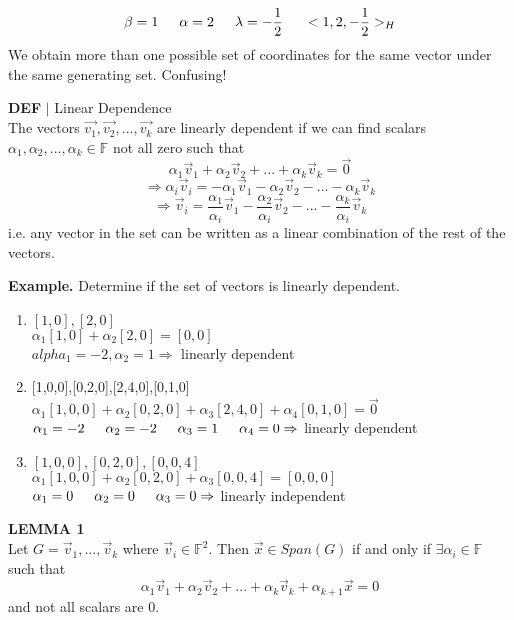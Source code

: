 \documentclass [12pt]{article}
\begin{document}
\[\beta=1\indent\alpha=2\indent\lambda=-\frac{1}{2}\indent<1,2,-\frac{1}{2}>_H\]
We obtain more than one possible set of coordinates for the same vector under the same generating set. Confusing!
\pagebreak
\begin{framed}
\noindent\textbf{DEF} $|$ Linear Dependence\\
The vectors ${\overrightarrow{v_1}, \overrightarrow{v_2},...,\overrightarrow{v_k}}$ are linearly dependent if we can find scalars $\alpha_1,\alpha_2,...,\alpha_k\in\mathbb{F}$ not all zero such that
\[\alpha_1\overrightarrow{v}_1+\alpha_2\overrightarrow{v}_2+...+\alpha_k\overrightarrow{v}_k=\overrightarrow{0}\]
\[\Rightarrow\alpha_i\overrightarrow{v}_i =-\alpha_1\overrightarrow{v}_1-\alpha_2\overrightarrow{v}_2-...-\alpha_k\overrightarrow{v}_k\]
\[\Rightarrow\overrightarrow{v}_i =\frac{\alpha_1}{\alpha_i}\overrightarrow{v}_1-\frac{\alpha_2}{\alpha_i}\overrightarrow{v}_2-...-\frac{\alpha_k}{\alpha_i}\overrightarrow{v}_k\]
i.e. any vector in the set can be written as a linear combination of the rest of the vectors.
\end{framed}
\noindent\textbf{Example. }Determine if the set of vectors is linearly dependent.
\begin{enumerate}[\quad(a)]
    \item ${[1,0],[2,0]}$ \\
    $\alpha_1[1,0]+\alpha_2[2,0] = [0,0]$\\
    $alpha_1=-2,\alpha_2=1\Rightarrow$ linearly dependent
    \item {[1,0,0],[0,2,0],[2,4,0],[0,1,0]}\\
    $\alpha_1[1,0,0]+\alpha_2[0,2,0]+\alpha_3[2, 4,0]+\alpha_4[0,1,0] = \overrightarrow{0}$\\
    $\alpha_1=-2\indent\alpha_2=-2\indent\alpha_3=1\indent\alpha_4=0\Rightarrow$ linearly dependent
    \item ${[1,0,0],[0,2,0],[0,0,4]}$\\
    $\alpha_1[1,0,0]+\alpha_2[0,2,0]+\alpha_3[0,0,4]=[0,0,0]$\\
    $\alpha_1=0\indent\alpha_2=0\indent\alpha_3=0\Rightarrow$ linearly independent
\end{enumerate}
\begin{framed}
\noindent\textbf{LEMMA 1}\\
Let $G={\overrightarrow{v}_1,...,\overrightarrow{v}_k}$ where $\overrightarrow{v}_i\in\mathbb{F}^2$. Then $\overrightarrow{x}\in Span(G)$ if and only if $\exists\alpha_i\in\mathbb{F}$ such that 
\[\alpha_1\overrightarrow{v}_1+\alpha_2\overrightarrow{v}_2+...+\alpha_k\overrightarrow{v}_k+\alpha_{k+1}\overrightarrow{x}=0\]
and not all scalars are 0.
\end{framed}
\end{document}
